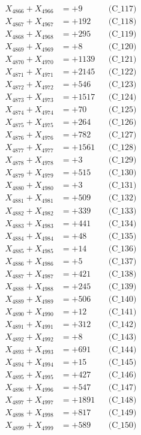 \documentclass[a4paper,10pt]{article}
\begin{document}
{\begin{align}
X_{4866} + X_{4966} &= +9 && \text{(C\_117)} \\
X_{4867} + X_{4967} &= +192 && \text{(C\_118)} \\
X_{4868} + X_{4968} &= +295 && \text{(C\_119)} \\
X_{4869} + X_{4969} &= +8 && \text{(C\_120)} \\
\allowbreak
X_{4870} + X_{4970} &= +1139 && \text{(C\_121)} \\
X_{4871} + X_{4971} &= +2145 && \text{(C\_122)} \\
X_{4872} + X_{4972} &= +546 && \text{(C\_123)} \\
X_{4873} + X_{4973} &= +1517 && \text{(C\_124)} \\
X_{4874} + X_{4974} &= +70 && \text{(C\_125)} \\
\allowbreak
X_{4875} + X_{4975} &= +264 && \text{(C\_126)} \\
X_{4876} + X_{4976} &= +782 && \text{(C\_127)} \\
X_{4877} + X_{4977} &= +1561 && \text{(C\_128)} \\
X_{4878} + X_{4978} &= +3 && \text{(C\_129)} \\
X_{4879} + X_{4979} &= +515 && \text{(C\_130)} \\
\allowbreak
X_{4880} + X_{4980} &= +3 && \text{(C\_131)} \\
X_{4881} + X_{4981} &= +509 && \text{(C\_132)} \\
X_{4882} + X_{4982} &= +339 && \text{(C\_133)} \\
X_{4883} + X_{4983} &= +441 && \text{(C\_134)} \\
X_{4884} + X_{4984} &= +48 && \text{(C\_135)} \\
\allowbreak
X_{4885} + X_{4985} &= +14 && \text{(C\_136)} \\
X_{4886} + X_{4986} &= +5 && \text{(C\_137)} \\
X_{4887} + X_{4987} &= +421 && \text{(C\_138)} \\
X_{4888} + X_{4988} &= +245 && \text{(C\_139)} \\
X_{4889} + X_{4989} &= +506 && \text{(C\_140)} \\
\allowbreak
X_{4890} + X_{4990} &= +12 && \text{(C\_141)} \\
X_{4891} + X_{4991} &= +312 && \text{(C\_142)} \\
X_{4892} + X_{4992} &= +8 && \text{(C\_143)} \\
X_{4893} + X_{4993} &= +691 && \text{(C\_144)} \\
X_{4894} + X_{4994} &= +15 && \text{(C\_145)} \\
\allowbreak
X_{4895} + X_{4995} &= +427 && \text{(C\_146)} \\
X_{4896} + X_{4996} &= +547 && \text{(C\_147)} \\
X_{4897} + X_{4997} &= +1891 && \text{(C\_148)} \\
X_{4898} + X_{4998} &= +817 && \text{(C\_149)} \\
X_{4899} + X_{4999} &= +589 && \text{(C\_150)} \\
\end{align}
}
\end{document}
